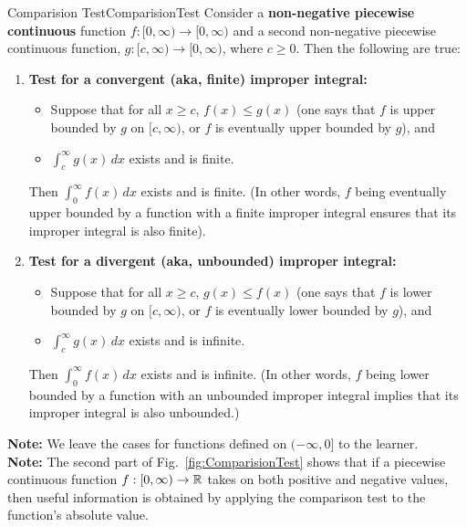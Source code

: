 \begin{propColor}{Comparision Test}{ComparisionTest}
    Consider a \textbf{non-negative piecewise continuous} function $f:[0, \infty) \to [0, \infty)$ and a second non-negative piecewise continuous function, $g:[c, \infty) \to [0, \infty)$, where $c\ge 0$. Then the following are true:

    \begin{enumerate}
\renewcommand{\labelenumi}{(\alph{enumi})}
\setlength{\itemsep}{.2cm}
    \item \textbf{Test for a convergent (aka, finite) improper integral:}
    \begin{itemize}
        \item Suppose that for all $x \ge c$, $f(x) \le g(x)$ (one says that $f$ is upper bounded by $g$ on $[c, \infty)$, or $f$ is eventually upper bounded by $g$), and 
        \item  $\int_c^\infty g(x) \, dx$ exists and is finite. 
    \end{itemize}
    Then $\int_0^\infty f(x) \, dx$ exists and is finite. (In other words, $f$ being eventually upper bounded by a function with a finite improper integral ensures that its improper integral is also finite).
    \item \textbf{Test for a divergent (aka, unbounded) improper integral:}
      \begin{itemize}
        \item Suppose that for all $x \ge c$, $g(x) \le f(x)$ (one says that $f$ is lower bounded by $g$ on $[c, \infty)$, or $f$ is eventually lower bounded by $g$), and 
        \item  $\int_c^\infty g(x) \, dx$ exists and is infinite. 
    \end{itemize}
    Then $\int_0^\infty f(x) \, dx$ exists and is infinite. (In other words, $f$ being lower bounded by a function with an unbounded improper integral implies that its improper integral is also unbounded.)
\end{enumerate}   

\textbf{Note:} We leave the cases for functions defined on $(-\infty, 0]$ to the learner. \\

\textbf{Note:} The second part of  Fig.~\ref{fig:ComparisionTest}  shows that if a piecewise continuous function  $f:[0, \infty) \to \mathbb R$ takes on both positive and negative values, then useful information is obtained by applying the comparison test to the function's absolute value.    
\end{propColor}

